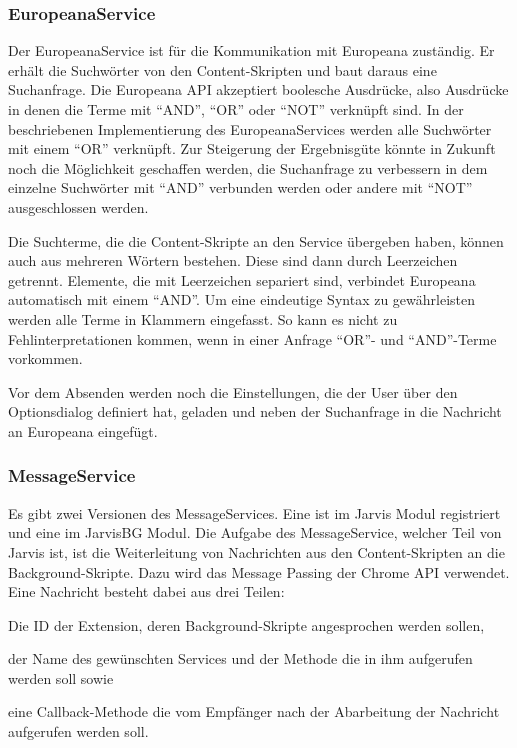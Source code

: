   \subsubsection{EuropeanaService}
  Der EuropeanaService ist für die Kommunikation mit Europeana zuständig. Er erhält die Suchwörter von den Content-Skripten und baut daraus eine Suchanfrage. Die Europeana API akzeptiert boolesche Ausdrücke, also Ausdrücke in denen die Terme mit ``AND'', ``OR'' oder ``NOT'' verknüpft sind. In der beschriebenen Implementierung des EuropeanaServices werden alle Suchwörter mit einem ``OR'' verknüpft. Zur Steigerung der Ergebnisgüte könnte in Zukunft noch die Möglichkeit geschaffen werden, die Suchanfrage zu verbessern in dem einzelne Suchwörter mit ``AND'' verbunden werden oder andere mit ``NOT'' ausgeschlossen werden.

  Die Suchterme, die die Content-Skripte an den Service übergeben haben, können auch aus mehreren Wörtern bestehen. Diese sind dann durch Leerzeichen getrennt. Elemente, die mit Leerzeichen separiert sind, verbindet Europeana automatisch mit einem ``AND''. Um eine eindeutige Syntax zu gewährleisten werden alle Terme in Klammern eingefasst. So kann es nicht zu Fehlinterpretationen kommen, wenn in einer Anfrage ``OR''- und ``AND''-Terme vorkommen.

  Vor dem Absenden werden noch die Einstellungen, die der User über den Optionsdialog definiert hat, geladen und neben der Suchanfrage in die Nachricht an Europeana eingefügt.

  \subsubsection{MessageService}
  Es gibt zwei Versionen des MessageServices. Eine ist im Jarvis Modul registriert und eine im JarvisBG Modul. Die Aufgabe des MessageService, welcher Teil von Jarvis ist, ist die Weiterleitung von Nachrichten aus den Content-Skripten an die Background-Skripte. Dazu wird das Message Passing der Chrome API verwendet. Eine Nachricht besteht dabei aus drei Teilen:
  \begin{enumerate*}
 	\item Die ID der Extension, deren Background-Skripte angesprochen werden sollen,
  	\item der Name des gewünschten Services und der Methode die in ihm aufgerufen werden soll sowie
 	\item eine Callback-Methode die vom Empfänger nach der Abarbeitung der Nachricht aufgerufen werden soll. 
  \end{enumerate*} 

